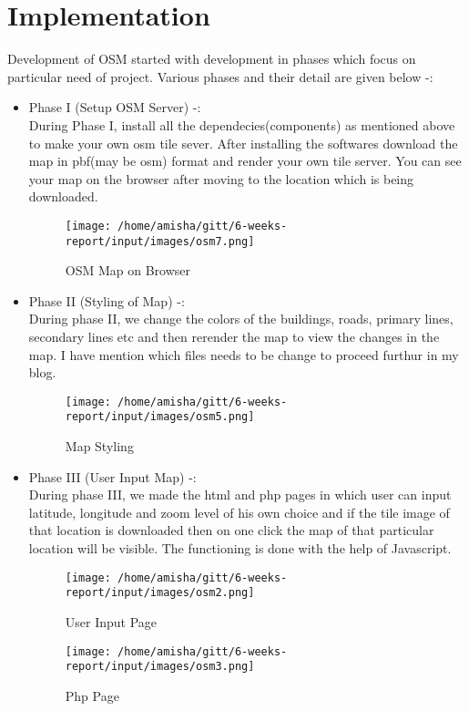 \section{Implementation}
Development of OSM started with development in phases which focus on particular need of project.
Various phases and their detail are given below -:
\begin{itemize}
\item Phase I (Setup OSM Server) -: \\
        During Phase I, install all the dependecies(components) as mentioned above to make your own osm tile sever. After installing the softwares download the map in pbf(may be osm) format and render your own tile server. You can see your map on the browser after moving to the location which is being downloaded.

\begin{figure}[ht]
\centering \texttt{[image: /home/amisha/gitt/6-weeks-report/input/images/osm7.png]}
\caption{OSM Map on Browser}
\end{figure}

\item Phase II (Styling of Map) -: \\
        During phase II, we change the colors of the buildings, roads, primary lines, secondary lines etc and then rerender the map to view the changes in the map. I have mention which files needs to be change to proceed furthur in my blog.  
\begin{figure}[ht]
\centering \texttt{[image: /home/amisha/gitt/6-weeks-report/input/images/osm5.png]}
\caption{Map Styling}
\end{figure}

\item Phase III (User Input Map) -: \\
        During phase III, we made the html and php pages in which user can input latitude, longitude and zoom level of his own choice and if the tile image of that location is downloaded then on one click the map of that particular location will be visible. The functioning is done with the help of Javascript.
\begin{figure}[ht]
\centering \texttt{[image: /home/amisha/gitt/6-weeks-report/input/images/osm2.png]}
\caption{User Input Page}
\end{figure}

\begin{figure}[ht]
\centering \texttt{[image: /home/amisha/gitt/6-weeks-report/input/images/osm3.png]}
\caption{Php Page}
\end{figure}


\end{itemize}
